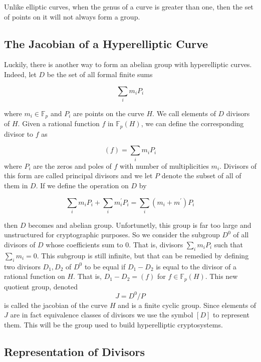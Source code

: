Unlike elliptic curves, when the genus of a curve is greater than one, then the set of points on it will not always form a group. 

\subsection{The Jacobian of a Hyperelliptic Curve}

Luckily, there is another way to form an abelian group with hyperelliptic curves. Indeed, let $D$ be the set of all formal finite sums 

$$ \sum_i m_i P_i $$ 

where $m_i \in \mathbb{F}_p$ and $P_i$ are points on the curve $H$. We call elements of $D$ divisors of $H$. Given a rational function $f$ in $\mathbb{F}_p(H)$, we can define the corresponding divisor to $f$ as

$$(f) = \sum_i m_i P_i $$ where $P_i$ are the zeros and poles of $f$ with number of multiplicities $m_i$. Divisors of this form are called principal divisors and we let $P$ denote the subset of all of them in $D$. If we define the operation on $D$ by 

$$ \sum_i m_i P_i  + \sum_i m^\prime_i P_i  = \sum_i (m_i+m^\prime) P_i $$ 

then $D$ becomes and abelian group. Unfortunetly, this group is far too large and unstructured for cryptographic purposes. So we consider the subgroup $D^0$ of all divisors of $D$ whose coefficients sum to $0$. That is, divisors $ \sum_i m_i P_i $ such that $\sum_i m_i = 0$. This subgroup is still infinite, but that can be remedied by defining two divisors $D_1, D_2$ of $D^0$ to be equal if $D_1 - D_2$ is equal to the divisor of a rational function on $H$. That is, $D_1 - D_2 = (f) $ for $f \in \mathbb{F}_p(H)$. This new quotient group, denoted $$J = D^0 / P$$ is called the jacobian of the curve $H$ and is a finite cyclic group. Since elements of $J$ are in fact equivalence classes of divisors we use the symbol $[D]$ to represent them. This will be the group used to build hyperelliptic cryptosystems.

\subsection{Representation of Divisors}


